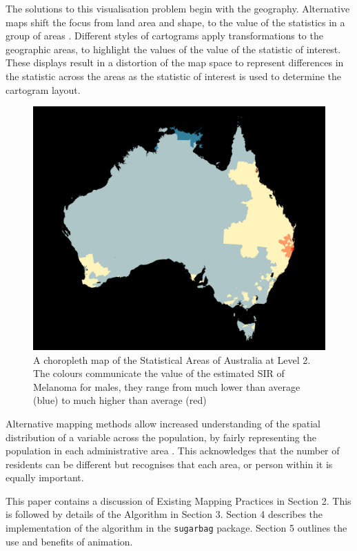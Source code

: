 The solutions to this visualisation problem begin with the geography.
Alternative maps shift the focus from land area and shape, to the value
of the statistics in a group of areas \citep{ACCAC}. Different styles of
cartograms apply transformations to the geographic areas, to highlight
the values of the value of the statistic of interest. These displays
result in a distortion of the map space to represent differences in the
statistic across the areas \citep{ACCAC} as the statistic of interest is
used to determine the cartogram layout.

\begin{figure}[h]
\centering
\includegraphics[width=14cm]{figs/aus_melanoma_p.pdf}
\caption{\label{fig:melanoma-geo}A choropleth map of the Statistical Areas of Australia at Level 2. The colours communicate the value of the estimated SIR of Melanoma for males, they range from much lower than average (blue) to much higher than average (red)}
\end{figure}

Alternative mapping methods allow increased understanding of the spatial
distribution of a variable across the population, by fairly representing
the population in each administrative area \citep{TAAM}. This
acknowledges that the number of residents can be different but
recognises that each area, or person within it is equally important.

This paper contains a discussion of Existing Mapping Practices in
Section 2. This is followed by details of the Algorithm in Section 3.
Section 4 describes the implementation of the algorithm in the
\texttt{sugarbag} package. Section 5 outlines the use and benefits of
animation.

